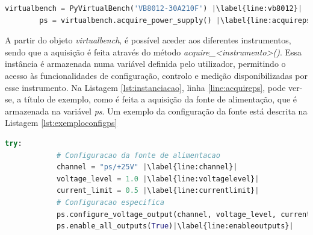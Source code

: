 \begin{center}
\begin{minipage}{0.9\linewidth}
	\begin{lstlisting}[language=Python,escapechar=|, caption=Instanciação da classe \textit{PyVirtualBench}, label=lst:instanciacao]
		virtualbench = PyVirtualBench('VB8012-30A210F') |\label{line:vb8012}|
		ps = virtualbench.acquire_power_supply() |\label{line:acquireps}|
	\end{lstlisting}
\end{minipage}
\end{center}

A partir do objeto \textit{virtualbench}, é possível aceder aos diferentes instrumentos, sendo que a aquisição é feita através do método \textit{acquire\_\textless instrumento\textgreater()}. Essa instância é armazenada numa variável definida pelo utilizador, permitindo o acesso às funcionalidades de configuração, controlo e medição disponibilizadas por esse instrumento. Na Listagem \ref{lst:instanciacao}, linha \ref{line:acquireps}, pode ver-se, a título de exemplo, como é feita a aquisição da fonte de alimentação, que é armazenada na variável \textit{ps}. Um exemplo da configuração da fonte está descrita na Listagem \ref{lst:exemploconfigps}

\begin{minipage}{0.7\linewidth}
	\begin{lstlisting}[language=Python,escapechar=|, caption=Exemplo \textit{ps\_example.py}, label=lst:exemploconfigps]
		try:
			# Configuracao da fonte de alimentacao
			channel = "ps/+25V" |\label{line:channel}| 
			voltage_level = 1.0 |\label{line:voltagelevel}|
			current_limit = 0.5 |\label{line:currentlimit}|
			# Configuracao especifica
			ps.configure_voltage_output(channel, voltage_level, current_limit)|\label{line:configvoltage}|
			ps.enable_all_outputs(True)|\label{line:enableoutputs}|
	\end{lstlisting}
\end{minipage}

